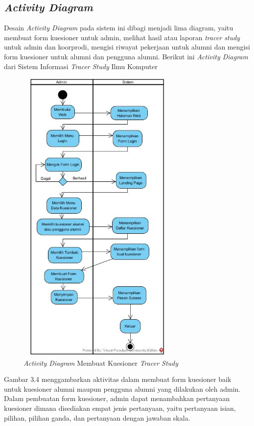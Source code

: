 \subsection{\textit{Activity Diagram}}

Desain \textit{Activity Diagram} pada sistem ini dibagi menjadi lima diagram, yaitu membuat form kuesioner untuk admin, melihat hasil atau laporan \textit{tracer study} untuk admin dan koorprodi, mengisi riwayat pekerjaan untuk alumni dan mengisi form kuesioner untuk alumni dan pengguna alumni. Berikut ini \textit{Activity Diagram} dari Sistem Informasi \textit{Tracer Study} Ilmu Komputer

\begin{figure}[H]
	\centering
	\includegraphics[width=8cm,height=15cm]{gambar/Activitykelolakuesioner}
	\caption{\emph{Activity Diagram} Membuat Kuesioner \textit{Tracer Study}}
	\label{activity_kelolakuesioner}
\end{figure}

Gambar 3.4 menggambarkan aktivitas dalam membuat form kuesioner baik untuk kuesioner alumni maupun pengguna alumni yang dilakukan oleh admin. Dalam pembuatan form kuesioner, admin dapat menambahkan pertanyaan kuesioner dimana disediakan empat jenis pertanyaan, yaitu pertanyaan isian, pilihan, pilihan ganda, dan pertanyaan dengan jawaban skala.  

